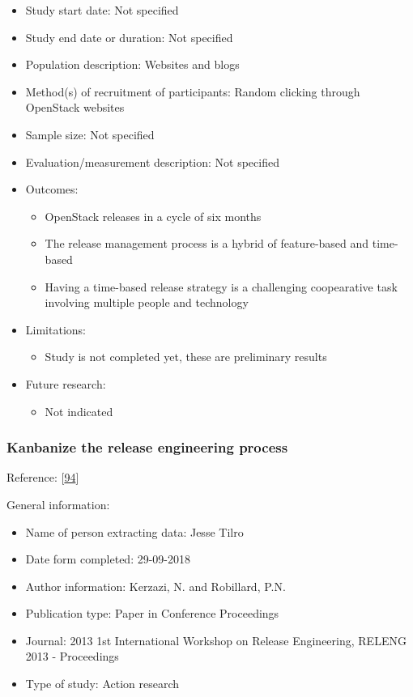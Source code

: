 \documentclass[]{book}
\providecommand{\tightlist}{%
  \setlength{\itemsep}{0pt}\setlength{\parskip}{0pt}}
\begin{document}
\begin{itemize}
\tightlist
\item
  Study start date: Not specified
\item
  Study end date or duration: Not specified
\item
  Population description: Websites and blogs
\item
  Method(s) of recruitment of participants: Random clicking through
  OpenStack websites
\item
  Sample size: Not specified
\item
  Evaluation/measurement description: Not specified
\item
  Outcomes:

  \begin{itemize}
  \tightlist
  \item
    OpenStack releases in a cycle of six months
  \item
    The release management process is a hybrid of feature-based and
    time-based
  \item
    Having a time-based release strategy is a challenging coopearative
    task involving multiple people and technology
  \end{itemize}
\item
  Limitations:

  \begin{itemize}
  \tightlist
  \item
    Study is not completed yet, these are preliminary results
  \end{itemize}
\item
  Future research:

  \begin{itemize}
  \tightlist
  \item
    Not indicated
  \end{itemize}
\end{itemize}

\subsubsection{Kanbanize the release engineering
process}\label{kanbanize-the-release-engineering-process}

Reference: {[}\protect\hyperlink{ref-kerzazi2013a}{94}{]}

General information:

\begin{itemize}
\tightlist
\item
  Name of person extracting data: Jesse Tilro
\item
  Date form completed: 29-09-2018
\item
  Author information: Kerzazi, N. and Robillard, P.N.
\item
  Publication type: Paper in Conference Proceedings
\item
  Journal: 2013 1st International Workshop on Release Engineering,
  RELENG 2013 - Proceedings
\item
  Type of study: Action research
\end{itemize}
\end{document}
